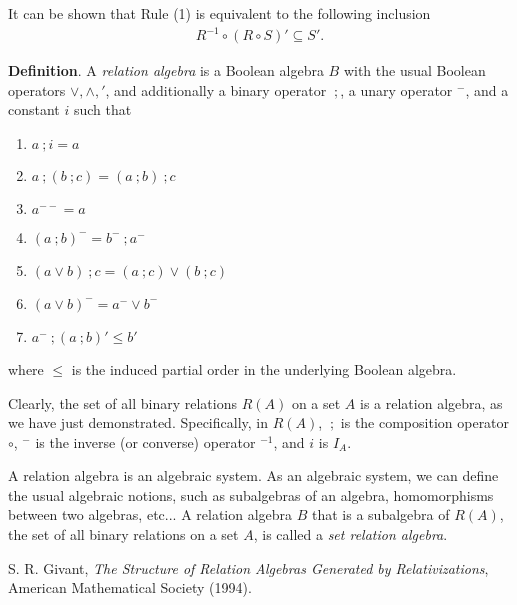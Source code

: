 \documentclass[12pt]{article}
\begin{document}
It can be shown that Rule (1) is equivalent to the following inclusion 
\begin{eqnarray}
R^{-1}\circ(R\circ S)'\subseteq S'.
\end{eqnarray}

\textbf{Definition}.  A \emph{relation algebra} is a Boolean algebra $B$ with the usual Boolean operators $\vee, \wedge, '$, and additionally a binary operator $\ ;$, a unary operator $^-$, and a constant $i$ such that
\begin{enumerate}
\item $a\ ;i=a$
\item $a\ ;(b\ ; c)=(a\ ;b)\ ;c$
\item $a^{--}=a$
\item $(a\ ;b)^-=b^-\ ;a^-$
\item $(a \vee b)\ ; c=(a\ ; c)\vee (b\ ; c)$
\item $(a \vee b)^- = a^- \vee b^-$
\item $a^- \ ; (a\ ; b)'\le b'$
\end{enumerate}
where $\le$ is the induced partial order in the underlying Boolean algebra.

Clearly, the set of all binary relations $R(A)$ on a set $A$ is a relation algebra, as we have just demonstrated.  Specifically, in $R(A)$, $\ ;$ is the composition operator $\circ$, $^-$ is the inverse (or converse) operator $^{-1}$, and $i$ is $I_A$.  

A relation algebra is an algebraic system.  As an algebraic system, we can define the usual algebraic notions, such as subalgebras of an algebra, homomorphisms between two algebras, etc...  A relation algebra $B$ that is a subalgebra of $R(A)$, the set of all binary relations on a set $A$, is called a \emph{set relation algebra}.

\begin{thebibliography}{8}
 S. R. Givant, \emph{The Structure of Relation Algebras Generated by Relativizations}, American Mathematical Society (1994).
\end{thebibliography}
\end{document}
